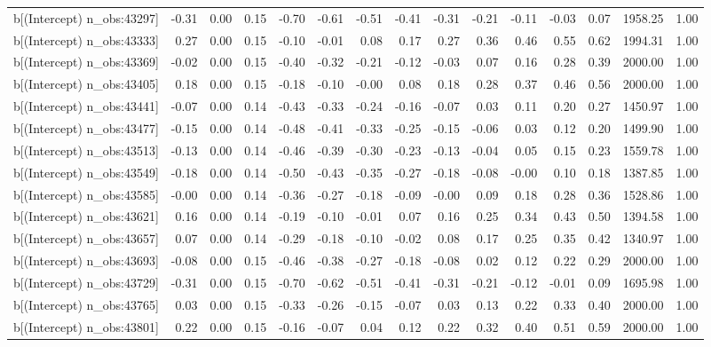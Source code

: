 \begin{table}[ht]
\begin{tabular}{rrrrrrrrrrrrrrr}
  b[(Intercept) n\_obs:43297] & -0.31 & 0.00 & 0.15 & -0.70 & -0.61 & -0.51 & -0.41 & -0.31 & -0.21 & -0.11 & -0.03 & 0.07 & 1958.25 & 1.00 \\ 
  b[(Intercept) n\_obs:43333] & 0.27 & 0.00 & 0.15 & -0.10 & -0.01 & 0.08 & 0.17 & 0.27 & 0.36 & 0.46 & 0.55 & 0.62 & 1994.31 & 1.00 \\ 
  b[(Intercept) n\_obs:43369] & -0.02 & 0.00 & 0.15 & -0.40 & -0.32 & -0.21 & -0.12 & -0.03 & 0.07 & 0.16 & 0.28 & 0.39 & 2000.00 & 1.00 \\ 
  b[(Intercept) n\_obs:43405] & 0.18 & 0.00 & 0.15 & -0.18 & -0.10 & -0.00 & 0.08 & 0.18 & 0.28 & 0.37 & 0.46 & 0.56 & 2000.00 & 1.00 \\ 
  b[(Intercept) n\_obs:43441] & -0.07 & 0.00 & 0.14 & -0.43 & -0.33 & -0.24 & -0.16 & -0.07 & 0.03 & 0.11 & 0.20 & 0.27 & 1450.97 & 1.00 \\ 
  b[(Intercept) n\_obs:43477] & -0.15 & 0.00 & 0.14 & -0.48 & -0.41 & -0.33 & -0.25 & -0.15 & -0.06 & 0.03 & 0.12 & 0.20 & 1499.90 & 1.00 \\ 
  b[(Intercept) n\_obs:43513] & -0.13 & 0.00 & 0.14 & -0.46 & -0.39 & -0.30 & -0.23 & -0.13 & -0.04 & 0.05 & 0.15 & 0.23 & 1559.78 & 1.00 \\ 
  b[(Intercept) n\_obs:43549] & -0.18 & 0.00 & 0.14 & -0.50 & -0.43 & -0.35 & -0.27 & -0.18 & -0.08 & -0.00 & 0.10 & 0.18 & 1387.85 & 1.00 \\ 
  b[(Intercept) n\_obs:43585] & -0.00 & 0.00 & 0.14 & -0.36 & -0.27 & -0.18 & -0.09 & -0.00 & 0.09 & 0.18 & 0.28 & 0.36 & 1528.86 & 1.00 \\ 
  b[(Intercept) n\_obs:43621] & 0.16 & 0.00 & 0.14 & -0.19 & -0.10 & -0.01 & 0.07 & 0.16 & 0.25 & 0.34 & 0.43 & 0.50 & 1394.58 & 1.00 \\ 
  b[(Intercept) n\_obs:43657] & 0.07 & 0.00 & 0.14 & -0.29 & -0.18 & -0.10 & -0.02 & 0.08 & 0.17 & 0.25 & 0.35 & 0.42 & 1340.97 & 1.00 \\ 
  b[(Intercept) n\_obs:43693] & -0.08 & 0.00 & 0.15 & -0.46 & -0.38 & -0.27 & -0.18 & -0.08 & 0.02 & 0.12 & 0.22 & 0.29 & 2000.00 & 1.00 \\ 
  b[(Intercept) n\_obs:43729] & -0.31 & 0.00 & 0.15 & -0.70 & -0.62 & -0.51 & -0.41 & -0.31 & -0.21 & -0.12 & -0.01 & 0.09 & 1695.98 & 1.00 \\ 
  b[(Intercept) n\_obs:43765] & 0.03 & 0.00 & 0.15 & -0.33 & -0.26 & -0.15 & -0.07 & 0.03 & 0.13 & 0.22 & 0.33 & 0.40 & 2000.00 & 1.00 \\ 
  b[(Intercept) n\_obs:43801] & 0.22 & 0.00 & 0.15 & -0.16 & -0.07 & 0.04 & 0.12 & 0.22 & 0.32 & 0.40 & 0.51 & 0.59 & 2000.00 & 1.00 \\ 

\end{tabular}
\end{table}
